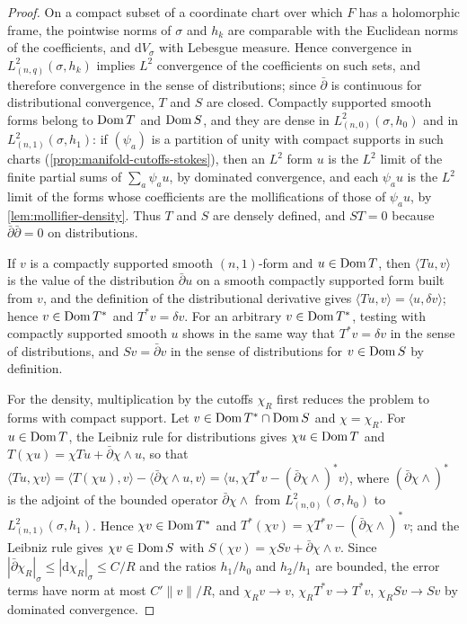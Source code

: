 \begin{proof}
On a compact subset of a coordinate chart over which $F$ has a holomorphic frame, the pointwise norms of $\sigma$ and $h_k$ are comparable with the Euclidean norms of the coefficients, and $\mathrm dV_\sigma$ with Lebesgue measure. Hence convergence in $L^2_{(n,q)}(\sigma,h_k)$ implies $L^2$ convergence of the coefficients on such sets, and therefore convergence in the sense of distributions; since $\bar\partial$ is continuous for distributional convergence, $T$ and $S$ are closed. Compactly supported smooth forms belong to $\operatorname{Dom} T$ and $\operatorname{Dom} S$, and they are dense in $L^2_{(n,0)}(\sigma,h_0)$ and in $L^2_{(n,1)}(\sigma,h_1)$: if $(\psi_a)$ is a partition of unity with compact supports in such charts (\cref{prop:manifold-cutoffs-stokes}), then an $L^2$ form $u$ is the $L^2$ limit of the finite partial sums of $\sum_a\psi_au$, by dominated convergence, and each $\psi_au$ is the $L^2$ limit of the forms whose coefficients are the mollifications of those of $\psi_au$, by \cref{lem:mollifier-density}. Thus $T$ and $S$ are densely defined, and $ST=0$ because $\bar\partial\bar\partial=0$ on distributions.

If $v$ is a compactly supported smooth $(n,1)$-form and $u\in\operatorname{Dom} T$, then $\langle Tu,v\rangle$ is the value of the distribution $\bar\partial u$ on a smooth compactly supported form built from $v$, and the definition of the distributional derivative gives $\langle Tu,v\rangle=\langle u,\delta v\rangle$; hence $v\in\operatorname{Dom} T^*$ and $T^*v=\delta v$. For an arbitrary $v\in\operatorname{Dom} T^*$, testing with compactly supported smooth $u$ shows in the same way that $T^*v=\delta v$ in the sense of distributions, and $Sv=\bar\partial v$ in the sense of distributions for $v\in\operatorname{Dom} S$ by definition.

For the density, multiplication by the cutoffs $\chi_R$ first reduces the problem to forms with compact support. Let $v\in\operatorname{Dom} T^*\cap\operatorname{Dom} S$ and $\chi=\chi_R$. For $u\in\operatorname{Dom} T$, the Leibniz rule for distributions gives $\chi u\in\operatorname{Dom} T$ and $T(\chi u)=\chi Tu+\bar\partial\chi\wedge u$, so that $\langle Tu,\chi v\rangle=\langle T(\chi u),v\rangle-\langle\bar\partial\chi\wedge u,v\rangle=\langle u,\chi T^*v-(\bar\partial\chi\wedge)^*v\rangle$, where $(\bar\partial\chi\wedge)^*$ is the adjoint of the bounded operator $\bar\partial\chi\wedge$ from $L^2_{(n,0)}(\sigma,h_0)$ to $L^2_{(n,1)}(\sigma,h_1)$. Hence $\chi v\in\operatorname{Dom} T^*$ and $T^*(\chi v)=\chi T^*v-(\bar\partial\chi\wedge)^*v$; and the Leibniz rule gives $\chi v\in\operatorname{Dom} S$ with $S(\chi v)=\chi Sv+\bar\partial\chi\wedge v$. Since $|\bar\partial\chi_R|_\sigma\leq|\mathrm d\chi_R|_\sigma\leq C/R$ and the ratios $h_1/h_0$ and $h_2/h_1$ are bounded, the error terms have norm at most $C'\|v\|/R$, and $\chi_Rv\to v$, $\chi_RT^*v\to T^*v$, $\chi_RSv\to Sv$ by dominated convergence.


\end{proof}
